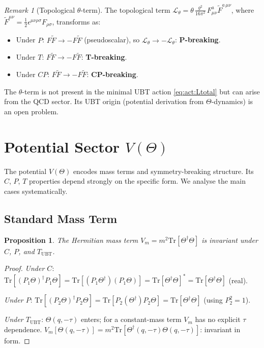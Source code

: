 \documentclass[12pt,a4paper]{article}
\newtheorem{proposition}[theorem]{Proposition}
\theoremstyle{definition}
\theoremstyle{remark}
\newtheorem{remark}[theorem]{Remark}
\begin{document}
\begin{remark}[Topological $\theta$-term]
\label{rem:act:theta_term}
The topological term
$\mathcal{L}_\theta = \theta\,\frac{g^2}{16\pi^2}\, F_{\mu\nu}^a \tilde{F}^{a\,\mu\nu}$,
where $\tilde{F}^{\mu\nu} = \tfrac{1}{2}\epsilon^{\mu\nu\rho\sigma}F_{\rho\sigma}$,
transforms as:
\begin{itemize}
  \item Under $P$: $F\tilde{F} \to -F\tilde{F}$ (pseudoscalar), so
    $\mathcal{L}_\theta \to -\mathcal{L}_\theta$: \textbf{P-breaking}.
  \item Under $T$: $F\tilde{F} \to -F\tilde{F}$: \textbf{T-breaking}.
  \item Under $CP$: $F\tilde{F} \to -F\tilde{F}$: \textbf{CP-breaking}.
\end{itemize}
The $\theta$-term is not present in the minimal UBT action \eqref{eq:act:Ltotal}
but can arise from the QCD sector.  Its UBT origin (potential derivation from
$\Theta$-dynamics) is an open problem.
\end{remark}

\section{Potential Sector $V(\Theta)$}
\label{sec:act:pot}

The potential $V(\Theta)$ encodes mass terms and symmetry-breaking structure.
Its $C$, $P$, $T$ properties depend strongly on the specific form.
We analyse the main cases systematically.

\subsection{Standard Mass Term}

\begin{proposition}
The Hermitian mass term $V_m = m^2 \mathrm{Tr}[\Theta^\dagger\Theta]$
is invariant under $C$, $P$, and $T_{\mathrm{UBT}}$.
\end{proposition}

\begin{proof}
\textit{Under $C$}: $\mathrm{Tr}[(P_1\Theta)^\dagger P_1\Theta]
= \mathrm{Tr}[(P_1\Theta^\dagger)(P_1\Theta)]
= \mathrm{Tr}[\Theta^\dagger\Theta]^*
= \mathrm{Tr}[\Theta^\dagger\Theta]$ (real). \checkmark

\textit{Under $P$}: $\mathrm{Tr}[(P_2\Theta)^\dagger P_2\Theta]
= \mathrm{Tr}[P_2(\Theta^\dagger)P_2\Theta]
= \mathrm{Tr}[\Theta^\dagger\Theta]$ (using $P_2^2 = 1$). \checkmark

\textit{Under $T_{\mathrm{UBT}}$}: $\Theta(q,-\tau)$ enters; for a
constant-mass term $V_m$ has no explicit $\tau$ dependence.
$V_m[\Theta(q,-\tau)] = m^2\mathrm{Tr}[\Theta^\dagger(q,-\tau)\Theta(q,-\tau)]$:
invariant in form. \checkmark
\end{proof}
\end{document}
